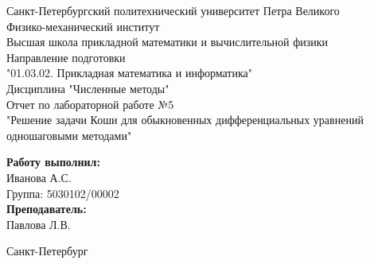 \begin{titlepage}	%

	\begin{center}		%

		\large Санкт-Петербургский политехнический университет Петра Великого\\
		\large Физико-механический институт \\
		\large Высшая школа прикладной математики и вычислительной физики\\[3cm]
		\large Направление подготовки\\
		\large "01.03.02. Прикладная математика и информатика"\\[3cm]
		\huge Дисциплина "Численные методы"\\[0.5cm] %
		\large Отчет по лабораторной работе №5\\[0.1cm]
		\large "Решение задачи Коши для обыкновенных дифференциальных уравнений одношаговыми методами"\\[5cm]

	\end{center}


	\begin{flushright} %
		\begin{minipage}{0.25\textwidth} %
			\begin{flushleft} %

				\large\textbf{Работу выполнил:}\\
				\large Иванова А.С.\\
				\large {Группа:} 5030102/00002\\
				
				\large \textbf{Преподаватель:}\\
				\large Павлова Л.В.

			\end{flushleft}
		\end{minipage}
	\end{flushright}
	
	\vfill %

	\begin{center}
	\large Санкт-Петербург\\
	\large \the\year %
	\end{center} %

\end{titlepage} %

\vfill %

